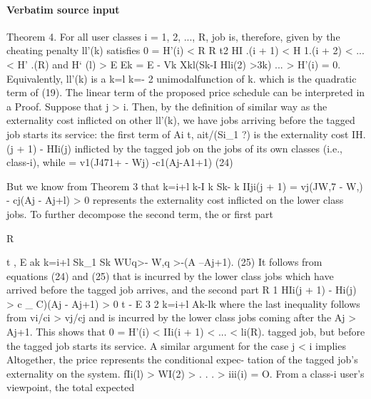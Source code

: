 \documentclass[10pt]{article}
\begin{document}
\paragraph{Verbatim source input}
\begin{ReviewVerbatim}
Theorem 4. For all user classes i = 1, 2, ..., R,
job is, therefore, given by
                                                                        the cheating penalty ll'(k) satisfies 0 = H'(i) <
  R       R   t2                                        HI .(i + 1) < H 1.(i + 2) < ... < H' .(R) and H` (l) >
  E       Ek        =     E      -   Vk           Xkl(Sk-I
                                                        Hli(2) >3k)
                                                                  ... > H'(i) = 0. Equivalently, ll'(k) is a
k=l k=- 2
                                                                        unimodalfunction of k.
which is the quadratic term of (19). The linear term
of the proposed price schedule can be interpreted in a                  Proof. Suppose that j > i. Then, by the definition of
similar way as the externality cost inflicted on other                  ll'(k), we have
jobs arriving before the tagged job starts its service:
the first term of Ai t, ait/(Si_1 ?) is the externality cost            IH.(j + 1) - HIi(j)
inflicted by the tagged job on the jobs of its own
classes (i.e., class-i), while                                              = v1(J471+ - Wj) -c1(Aj-A1+1) (24)

                                                                        But we know from Theorem 3 that
     k=i+l k-I k Sk- k
                                                                        IIji(j + 1) = vj(JW,7 - W,) - cj(Aj - Aj+l) > 0
represents the externality cost inflicted on the lower
class jobs. To further decompose the second term, the                  or
first part

      R


      t , E ak
    k=i+l Sk_1 Sk
                                                                         WUq>- W,q >-(A --Aj+1). (25)
                                         It follows from equations (24) and (25) that
is incurred by the lower class jobs which have arrived
before the tagged job arrives, and the second part
          R   1
                                                                        HIi(j + 1) - Hi(j) > c _ C)(Aj - Aj+1) > 0
t - E 3 2
    k=i+l Ak-lk
                                                                       where the last inequality follows from vi/ci > vj/cj and
is incurred by the lower class jobs coming after the                   Aj > Aj+1. This shows that 0 = H'(i) < IIi(i + 1) <
                                                                        ... < li(R).
tagged job, but before the tagged job starts its service.
                                                                            A similar argument for the case j < i implies
Altogether, the price represents the conditional expec-
tation of the tagged job's externality on the system.
                                                                        fIi(l) > WI(2) > . . . > iii(i) = O.
  From a class-i user's viewpoint, the total expected
\end{ReviewVerbatim}
\end{document}
